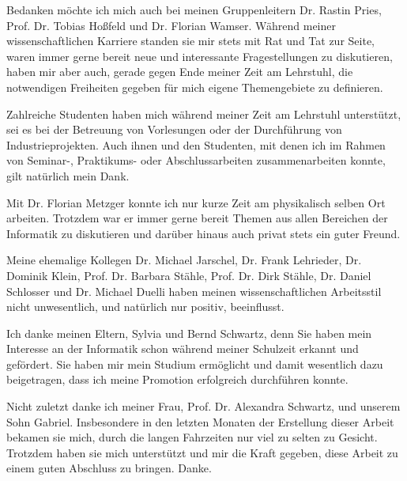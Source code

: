 Bedanken möchte ich mich auch bei meinen Gruppenleitern Dr. Rastin Pries, Prof. Dr. Tobias Hoßfeld und Dr. Florian Wamser.
Während meiner wissenschaftlichen Karriere standen sie mir stets mit Rat und Tat zur Seite, waren immer gerne bereit neue und interessante Fragestellungen zu diskutieren, haben mir aber auch, gerade gegen Ende meiner Zeit am Lehrstuhl, die notwendigen Freiheiten gegeben für mich eigene Themengebiete zu definieren. %

Zahlreiche Studenten haben mich während meiner Zeit am Lehrstuhl unterstützt, sei es bei der Betreuung von Vorlesungen oder der Durchführung von Industrieprojekten.
Auch ihnen und den Studenten, mit denen ich im Rahmen von Seminar-, Praktikums- oder Abschlussarbeiten zusammenarbeiten konnte, gilt natürlich mein Dank. %

Mit Dr. Florian Metzger konnte ich nur kurze Zeit am physikalisch selben Ort arbeiten.
Trotzdem war er immer gerne bereit Themen aus allen Bereichen der Informatik zu diskutieren und darüber hinaus auch privat stets ein guter Freund. %

Meine ehemalige Kollegen Dr. Michael Jarschel, Dr. Frank Lehrieder, Dr. Dominik Klein, Prof. Dr. Barbara Stähle, Prof. Dr. Dirk Stähle, Dr. Daniel Schlosser und Dr. Michael Duelli haben meinen wissenschaftlichen Arbeitsstil nicht unwesentlich, und natürlich nur positiv, beeinflusst. %

Ich danke meinen Eltern, Sylvia und Bernd Schwartz, denn Sie haben mein Interesse an der Informatik schon während meiner Schulzeit erkannt und gefördert.
Sie haben mir mein Studium ermöglicht und damit wesentlich dazu beigetragen, dass ich meine Promotion erfolgreich durchführen konnte. %

Nicht zuletzt danke ich meiner Frau, Prof. Dr. Alexandra Schwartz, und unserem Sohn Gabriel.
Insbesondere in den letzten Monaten der Erstellung dieser Arbeit bekamen sie mich, durch die langen Fahrzeiten nur viel zu selten zu Gesicht.
Trotzdem haben sie mich unterstützt und mir die Kraft gegeben, diese Arbeit zu einem guten Abschluss zu bringen.
Danke. %